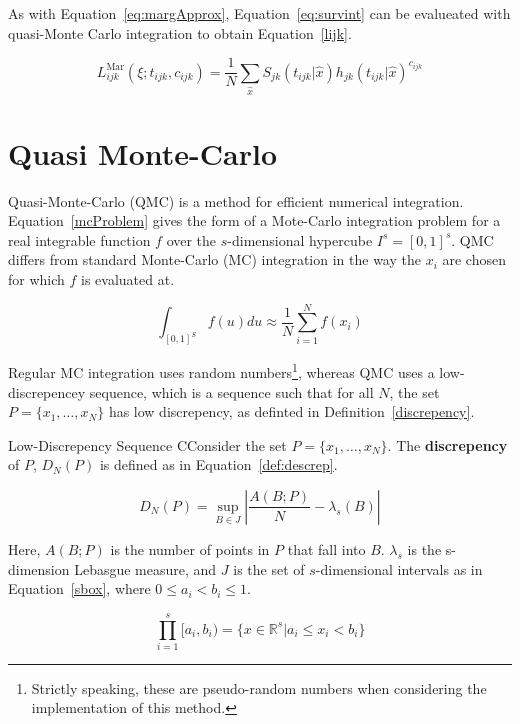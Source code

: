 As with Equation~\ref{eq:margApprox}, Equation~\ref{eq:survint} can be evalueated with quasi-Monte Carlo integration to obtain Equation~\ref{lijk}. 

\begin{equation}
    L_{ijk}^{\text{Mar}}(\xi; t_{ijk}, c_{ijk}) = \frac{1}{N}\sum_{\hat{x}}S_{jk}(t_{ijk}|\hat{x})h_{jk}(t_{ijk}|\hat{x})^{c_{ijk}}
    \label{lijk}
\end{equation}

\section{Quasi Monte-Carlo}\label{qmcSec}
Quasi-Monte-Carlo (QMC) is a method for efficient numerical integration. Equation~\ref{mcProblem} gives the form of a Mote-Carlo integration problem for a real integrable function $f$ over the $s$-dimensional hypercube $I^s = [0,1]^s$. QMC differs from standard Monte-Carlo (MC) integration in the way the $x_i$ are chosen for which $f$ is evaluated at. 

\begin{equation}
    \int_{[0,1]^S}f(u)du \approx \frac{1}{N}\sum_{i = 1}^{N}f(x_i)
    \label{mcProblem}
\end{equation}

Regular MC integration uses random numbers\footnote{Strictly speaking, these are pseudo-random numbers when considering the implementation of this method.}, whereas QMC uses a low-discrepencey sequence, which is a sequence such that for all $N$, the set $P = \{x_1, \ldots, x_N\}$ has low discrepency, as definted in Definition~\ref{discrepency}.

\begin{definition}{Low-Discrepency Sequence}
    CConsider the set $P = \{x_1, \ldots, x_N\}$. The \textbf{discrepency} of $P$, $D_N(P)$ is defined as in Equation~\ref{def:descrep}.

    \begin{equation}
        D_N(P) = \sup_{B \in J}\left|\frac{A(B;P)}{N} - \lambda_s(B)\right|
        \label{def:descrep}
    \end{equation}

    Here, $A(B;P)$ is the number of points in $P$ that fall into $B$. $\lambda_s$ is the s-dimension Lebasgue measure, and $J$ is the set of $s$-dimensional intervals as in Equation~\ref{sbox}, where $0 \leq a_i < b_i \leq 1$.
    
    \begin{equation}
        \prod_{i = 1}^{s} [a_i,b_i) = \{x \in \mathbb{R}^s | a_i \leq x_i < b_i \}
        \label{sbox}
    \end{equation}
\label{discrepency}
\end{definition}

